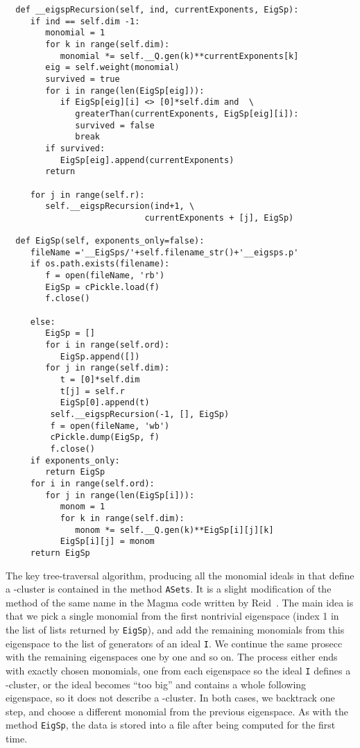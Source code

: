 \singlespacing
\begin{verbatim}
  def __eigspRecursion(self, ind, currentExponents, EigSp):
     if ind == self.dim -1:
        monomial = 1
        for k in range(self.dim):
           monomial *= self.__Q.gen(k)**currentExponents[k]
        eig = self.weight(monomial) 
        survived = true
        for i in range(len(EigSp[eig])):
           if EigSp[eig][i] <> [0]*self.dim and  \ 
              greaterThan(currentExponents, EigSp[eig][i]):
              survived = false
              break
        if survived:
           EigSp[eig].append(currentExponents)
        return

     for j in range(self.r):
        self.__eigspRecursion(ind+1, \ 
                            currentExponents + [j], EigSp)   

  def EigSp(self, exponents_only=false):
     fileName ='__EigSps/'+self.filename_str()+'__eigsps.p'
     if os.path.exists(filename):
        f = open(fileName, 'rb')
        EigSp = cPickle.load(f)
        f.close()
        
     else:
        EigSp = []
        for i in range(self.ord):
           EigSp.append([])
        for j in range(self.dim):
           t = [0]*self.dim
           t[j] = self.r
           EigSp[0].append(t)
         self.__eigspRecursion(-1, [], EigSp) 
         f = open(fileName, 'wb')
         cPickle.dump(EigSp, f)
         f.close()      
     if exponents_only:
        return EigSp
     for i in range(self.ord):
        for j in range(len(EigSp[i])):
           monom = 1
           for k in range(self.dim):
              monom *= self.__Q.gen(k)**EigSp[i][j][k]
           EigSp[i][j] = monom
     return EigSp
\end{verbatim}

\vspace{5pt}

\noindent The key tree-traversal algorithm, producing all the monomial ideals in  that define a -cluster is contained in the method \texttt{ASets}. It is a slight modification of the method of the same name in the Magma code written by Reid~\cite{milesmagma}. The main idea is that we pick a single monomial from the first nontrivial eigenspace (index 1 in the list of lists returned by \texttt{EigSp}), and add the remaining monomials from this eigenspace to the list of generators of an ideal \texttt{I}. We continue the same prosecc with the remaining eigenspaces one by one and so on. The process either ends with exactly  chosen monomials, one from each eigenspace so the ideal \texttt{I} defines a -cluster, or the ideal becomes ``too big'' and contains a whole following eigenspace, so it does not describe a -cluster. In both cases, we backtrack one step, and choose a different monomial from the previous eigenspace. As with the method \texttt{EigSp}, the data is stored into a file after being computed for the first time.

